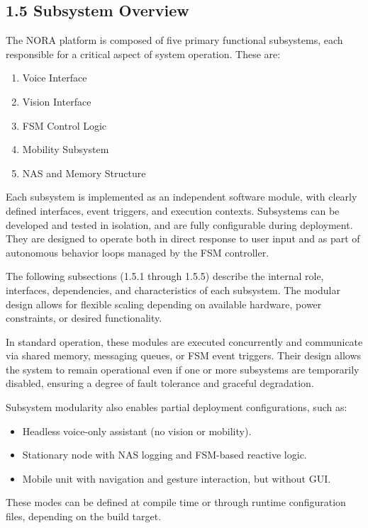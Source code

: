 \subsection*{1.5 Subsystem Overview}

The NORA platform is composed of five primary functional subsystems, each responsible for a critical aspect of system operation. These are:

\begin{enumerate}
    \item Voice Interface
    \item Vision Interface
    \item FSM Control Logic
    \item Mobility Subsystem
    \item NAS and Memory Structure
\end{enumerate}

Each subsystem is implemented as an independent software module, with clearly defined interfaces, event triggers, and execution contexts. Subsystems can be developed and tested in isolation, and are fully configurable during deployment. They are designed to operate both in direct response to user input and as part of autonomous behavior loops managed by the FSM controller.

The following subsections (1.5.1 through 1.5.5) describe the internal role, interfaces, dependencies, and characteristics of each subsystem. The modular design allows for flexible scaling depending on available hardware, power constraints, or desired functionality.

In standard operation, these modules are executed concurrently and communicate via shared memory, messaging queues, or FSM event triggers. Their design allows the system to remain operational even if one or more subsystems are temporarily disabled, ensuring a degree of fault tolerance and graceful degradation.

Subsystem modularity also enables partial deployment configurations, such as:
\begin{itemize}
    \item Headless voice-only assistant (no vision or mobility).
    \item Stationary node with NAS logging and FSM-based reactive logic.
    \item Mobile unit with navigation and gesture interaction, but without GUI.
\end{itemize}

These modes can be defined at compile time or through runtime configuration files, depending on the build target.

